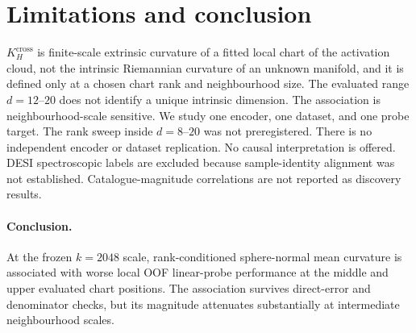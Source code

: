 \documentclass[mlabstract]{jmlr}
\begin{document}
\section{Limitations and conclusion}
\label{sec:limit}

$K_{H}^{\mathrm{cross}}$ is finite-scale extrinsic curvature of a fitted local chart of the activation cloud, not the intrinsic Riemannian curvature of an unknown manifold, and it is defined only at a chosen chart rank and neighbourhood size. The evaluated range $d{=}12$--$20$ does not identify a unique intrinsic dimension. The association is neighbourhood-scale sensitive. We study one encoder, one dataset, and one probe target. The rank sweep inside $d{=}8$--$20$ was not preregistered. There is no independent encoder or dataset replication. No causal interpretation is offered. DESI spectroscopic labels are excluded because sample-identity alignment was not established. Catalogue-magnitude correlations are not reported as discovery results.

\paragraph{Conclusion.}
At the frozen $k{=}2048$ scale, rank-conditioned sphere-normal mean curvature is associated with worse local OOF linear-probe performance at the middle and upper evaluated chart positions. The association survives direct-error and denominator checks, but its magnitude attenuates substantially at intermediate neighbourhood scales.

\clearpage


\clearpage
\appendix

\end{document}
